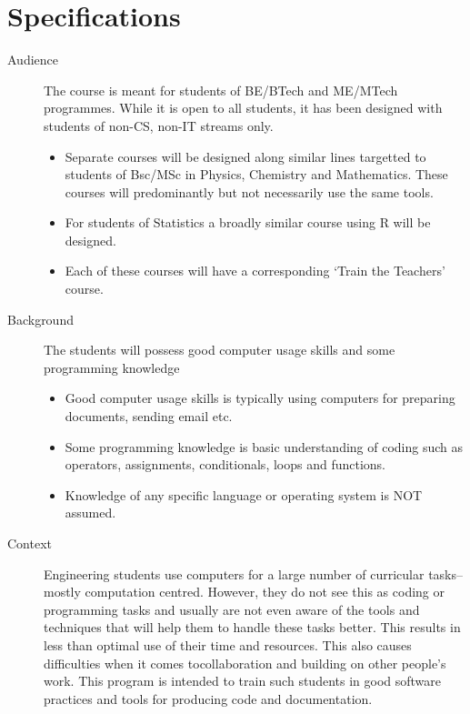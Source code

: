 \documentclass{article}
\begin{document}
\section{Specifications}
\begin{description}

\item[Audience] The course is meant for students of BE/BTech and ME/MTech programmes. While it is open to all students,
    it has been designed with students of non-CS, non-IT streams only.
\begin{itemize}
\item Separate courses will be designed along similar lines targetted to students of Bsc/MSc in Physics, Chemistry and Mathematics. These courses will predominantly but not necessarily use the same tools.
\item For students of Statistics a broadly similar course using R will be designed. 
\item Each of these courses will have a corresponding `Train the Teachers' course.
\end{itemize}

\item[Background] The students will possess good computer usage skills and some programming knowledge
\begin{itemize}
\item Good computer usage skills is typically using computers for preparing documents, sending email etc.
\item Some programming knowledge is basic understanding of coding such as operators, assignments, conditionals, loops
    and functions.
\item Knowledge of any specific language or operating system is NOT assumed.
\end{itemize}

\item[Context] Engineering students use computers for a large number of
    curricular tasks--mostly computation centred. However, they do not
    see this as coding or programming tasks and usually are not even
    aware of the tools and techniques that will help them to handle
    these tasks better. This results in less than optimal use of their
    time and resources. This also causes difficulties when it comes
    tocollaboration and building on other people's work. This program is
    intended to train such students in good software practices and tools
    for producing code and documentation.
\end{description}
\end{document}
